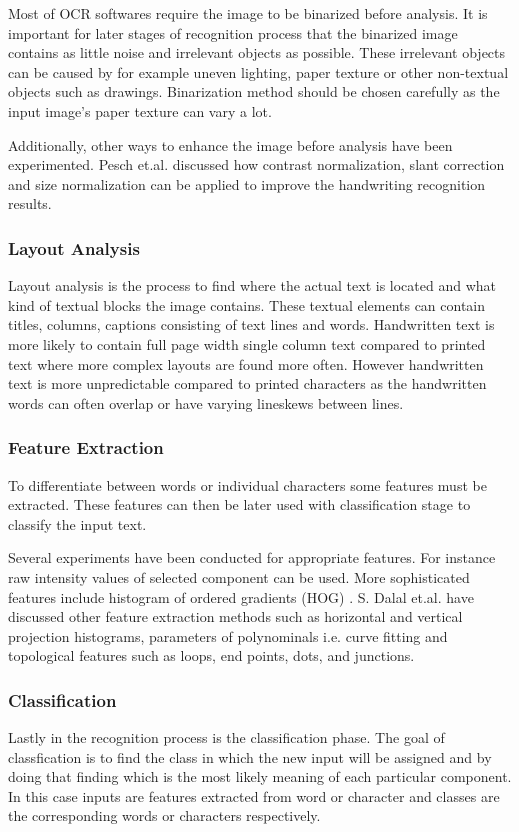 \documentclass{article}
\begin{document}
        Most of OCR softwares require the image to be binarized before analysis. It is important for later stages of recognition process that the binarized image contains as little noise and irrelevant objects as possible.  These irrelevant objects can be caused by for example uneven lighting, paper texture or other non-textual objects such as drawings. Binarization method should be chosen carefully as the input image's paper texture can vary a lot.

        Additionally, other ways to enhance the image before analysis have been experimented. Pesch et.al. discussed how contrast normalization, slant correction and size normalization can be applied to improve the handwriting recognition results. \cite{Pesch2012}

      \subsubsection{Layout Analysis}
        Layout analysis is the process to find where the actual text is located and what kind of textual blocks the image contains. These textual elements can contain titles, columns, captions consisting of text lines and words. Handwritten text is more likely to contain full page width single column text compared to printed text where more complex layouts are found more often. However handwritten text is more unpredictable compared to printed characters as the handwritten words can often overlap or have varying lineskews between lines.

      \subsubsection{Feature Extraction}
        To differentiate between words or individual characters some features must be extracted. These features can then be later used with classification stage to classify the input text.

        Several experiments have been conducted for appropriate features. For instance raw intensity values of selected component can be used. More sophisticated features include histogram of ordered gradients (HOG) \cite{Dalal2005}. S. Dalal et.al. have discussed other feature extraction methods such as horizontal and vertical projection histograms, parameters of polynominals i.e. curve fitting and topological features such as loops, end points, dots, and junctions. \cite{Dalal}

      \subsubsection{Classification}
        Lastly in the recognition process is the classification phase. The goal of classfication is to find the class in which the new input will be assigned and by doing that finding which is the most likely meaning of each particular component. In this case inputs are features extracted from word or character and classes are the corresponding words or characters respectively.
\end{document}
